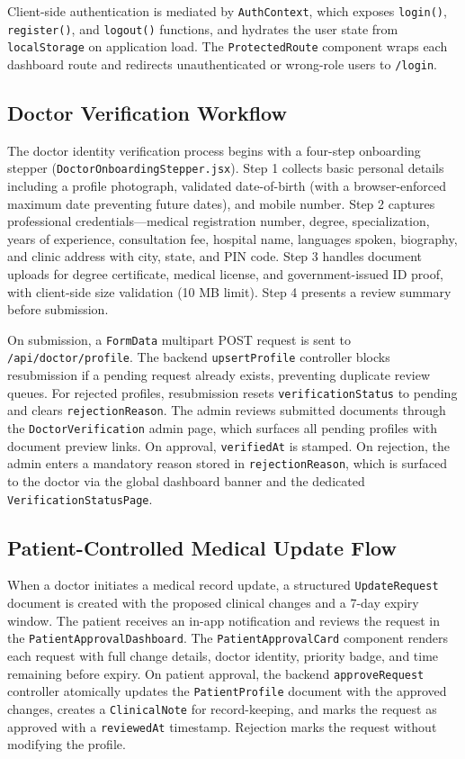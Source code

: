 Client-side authentication is mediated by \texttt{AuthContext}, which exposes \texttt{login()}, \texttt{register()}, and \texttt{logout()} functions, and hydrates the user state from \texttt{localStorage} on application load. The \texttt{ProtectedRoute} component wraps each dashboard route and redirects unauthenticated or wrong-role users to \texttt{/login}.

\subsection{Doctor Verification Workflow}

The doctor identity verification process begins with a four-step onboarding stepper (\texttt{DoctorOnboardingStepper.jsx}). Step 1 collects basic personal details including a profile photograph, validated date-of-birth (with a browser-enforced maximum date preventing future dates), and mobile number. Step 2 captures professional credentials—medical registration number, degree, specialization, years of experience, consultation fee, hospital name, languages spoken, biography, and clinic address with city, state, and PIN code. Step 3 handles document uploads for degree certificate, medical license, and government-issued ID proof, with client-side size validation (10 MB limit). Step 4 presents a review summary before submission.

On submission, a \texttt{FormData} multipart POST request is sent to \texttt{/api/doctor/profile}. The backend \texttt{upsertProfile} controller blocks resubmission if a pending request already exists, preventing duplicate review queues. For rejected profiles, resubmission resets \texttt{verificationStatus} to pending and clears \texttt{rejectionReason}. The admin reviews submitted documents through the \texttt{DoctorVerification} admin page, which surfaces all pending profiles with document preview links. On approval, \texttt{verifiedAt} is stamped. On rejection, the admin enters a mandatory reason stored in \texttt{rejectionReason}, which is surfaced to the doctor via the global dashboard banner and the dedicated \texttt{VerificationStatusPage}.

\subsection{Patient-Controlled Medical Update Flow}

When a doctor initiates a medical record update, a structured \texttt{UpdateRequest} document is created with the proposed clinical changes and a 7-day expiry window. The patient receives an in-app notification and reviews the request in the \texttt{PatientApprovalDashboard}. The \texttt{PatientApprovalCard} component renders each request with full change details, doctor identity, priority badge, and time remaining before expiry. On patient approval, the backend \texttt{approveRequest} controller atomically updates the \texttt{PatientProfile} document with the approved changes, creates a \texttt{ClinicalNote} for record-keeping, and marks the request as approved with a \texttt{reviewedAt} timestamp. Rejection marks the request without modifying the profile.

